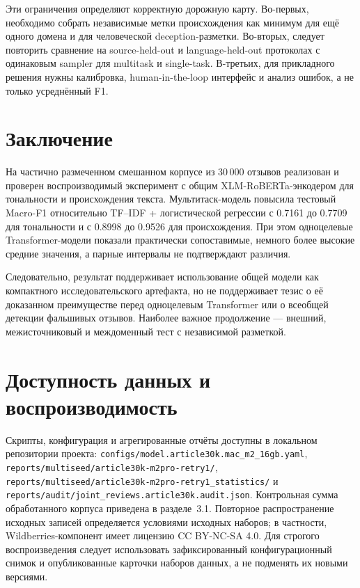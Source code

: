 \documentclass[11pt,a4paper]{article}
\newcommand{\repo}[1]{\nolinkurl{#1}}
\begin{document}
Эти ограничения определяют корректную дорожную карту. Во-первых, необходимо собрать независимые метки происхождения как минимум для ещё одного домена и для человеческой deception-разметки. Во-вторых, следует повторить сравнение на source-held-out и language-held-out протоколах с одинаковым sampler для multitask и single-task. В-третьих, для прикладного решения нужны калибровка, human-in-the-loop интерфейс и анализ ошибок, а не только усреднённый F1.

\section{Заключение}

На частично размеченном смешанном корпусе из 30\,000 отзывов реализован и проверен воспроизводимый эксперимент с общим XLM-RoBERTa-энкодером для тональности и происхождения текста. Мультитаск-модель повысила тестовый Macro-F1 относительно TF--IDF + логистической регрессии с 0.7161 до 0.7709 для тональности и с 0.8998 до 0.9526 для происхождения. При этом одноцелевые Transformer-модели показали практически сопоставимые, немного более высокие средние значения, а парные интервалы не подтверждают различия.

Следовательно, результат поддерживает использование общей модели как компактного исследовательского артефакта, но не поддерживает тезис о её доказанном преимуществе перед одноцелевым Transformer или о всеобщей детекции фальшивых отзывов. Наиболее важное продолжение --- внешний, межисточниковый и междоменный тест с независимой разметкой.

\section*{Доступность данных и воспроизводимость}

Скрипты, конфигурация и агрегированные отчёты доступны в локальном репозитории проекта: \repo{configs/model.article30k.mac\_m2\_16gb.yaml}, \repo{reports/multiseed/article30k-m2pro-retry1/}, \repo{reports/multiseed/article30k-m2pro-retry1\_statistics/} и \repo{reports/audit/joint\_reviews.article30k.audit.json}. Контрольная сумма обработанного корпуса приведена в разделе~3.1. Повторное распространение исходных записей определяется условиями исходных наборов; в частности, Wildberries-компонент имеет лицензию CC BY-NC-SA 4.0. Для строгого воспроизведения следует использовать зафиксированный конфигурационный снимок и опубликованные карточки наборов данных, а не подменять их новыми версиями.
\end{document}
